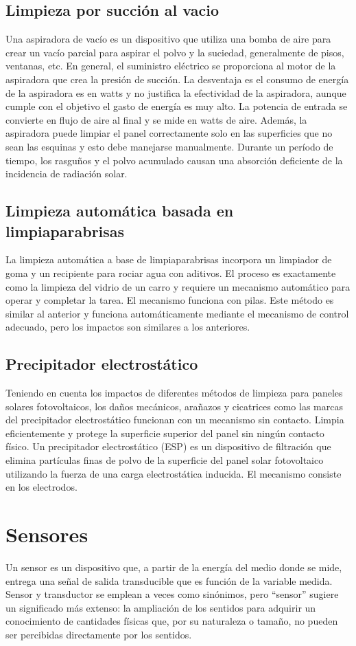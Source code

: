 \subsection{Limpieza por succión al vacio}
Una aspiradora de vacío es un dispositivo que utiliza una bomba de aire para crear un vacío parcial para aspirar el polvo y la suciedad, generalmente de pisos, ventanas, etc. En general, el suministro eléctrico se proporciona al motor de la aspiradora que crea la presión de succión. La desventaja es el consumo de energía de la aspiradora es en watts y no justifica la efectividad de la aspiradora, aunque cumple con el objetivo el gasto de energía es muy alto.
La potencia de entrada se convierte en flujo de aire al final y se mide en watts de aire. Además, la aspiradora puede limpiar el panel correctamente solo en las superficies que no sean las esquinas y esto debe manejarse manualmente. Durante un período de tiempo, los rasguños y el polvo acumulado causan una absorción deficiente de la incidencia de radiación solar.
\subsection{Limpieza automática basada en limpiaparabrisas}
La limpieza automática a base de limpiaparabrisas incorpora un limpiador de goma y un recipiente para rociar agua con aditivos. El proceso es exactamente como la limpieza del vidrio de un carro y requiere un mecanismo automático para operar y completar la tarea. El mecanismo funciona con pilas. Este método es similar al anterior y funciona automáticamente mediante el mecanismo de control adecuado, pero los impactos son similares a los anteriores.
\subsection{Precipitador electrostático}
Teniendo en cuenta los impactos de diferentes métodos de limpieza para paneles solares fotovoltaicos, los daños mecánicos, arañazos y cicatrices como las marcas del precipitador electrostático funcionan con un mecanismo sin contacto. Limpia eficientemente y protege la superficie superior del panel sin ningún contacto físico. Un precipitador electrostático (ESP) es un dispositivo de filtración que elimina partículas finas de polvo de la superficie del panel solar fotovoltaico utilizando la fuerza de una carga electrostática inducida. El mecanismo consiste en los electrodos.
\section{Sensores}
Un sensor es un dispositivo que, a partir de la energía del medio donde se mide, entrega una señal de salida transducible que es función de la variable medida. Sensor y transductor se emplean a veces como sinónimos, pero “sensor” sugiere un significado más extenso: la ampliación de los sentidos para adquirir un conocimiento de cantidades físicas que, por su naturaleza o tamaño, no pueden ser percibidas directamente por los sentidos.
